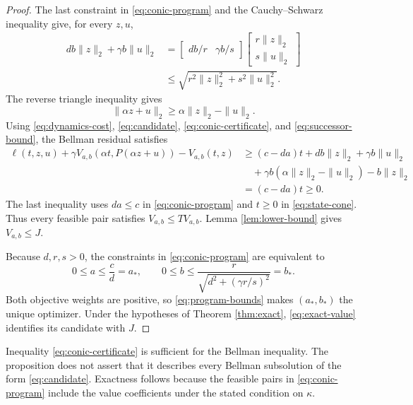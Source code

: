 \documentclass[10pt]{article}
\begin{document}
\begin{proof}
The last constraint in \eqref{eq:conic-program} and the Cauchy--Schwarz inequality give, for every $z,u$,
\begin{equation}
\begin{aligned}
db\|z\|_2+\gamma b\|u\|_2
&=\begin{bmatrix}db/r&\gamma b/s\end{bmatrix}
  \begin{bmatrix}r\|z\|_2\\s\|u\|_2\end{bmatrix}\\
&\leq\sqrt{r^2\|z\|_2^2+s^2\|u\|_2^2}.
\end{aligned}
\label{eq:conic-certificate}
\end{equation}
The reverse triangle inequality gives
\begin{equation}
\|\alpha z+u\|_2\geq\alpha\|z\|_2-\|u\|_2.
\label{eq:successor-bound}
\end{equation}
Using \eqref{eq:dynamics-cost}, \eqref{eq:candidate}, \eqref{eq:conic-certificate}, and \eqref{eq:successor-bound}, the Bellman residual satisfies
\begin{equation}
\begin{aligned}
\ell(t,z,u)+\gamma V_{a,b}(\alpha t,P(\alpha z+u))-V_{a,b}(t,z)
&\geq(c-da)t+db\|z\|_2+\gamma b\|u\|_2\\
&\quad+\gamma b(\alpha\|z\|_2-\|u\|_2)-b\|z\|_2\\
&=(c-da)t\geq0.
\end{aligned}
\label{eq:certified-residual}
\end{equation}
The last inequality uses $da\leq c$ in \eqref{eq:conic-program} and $t\geq0$ in \eqref{eq:state-cone}. Thus every feasible pair satisfies $V_{a,b}\leq TV_{a,b}$. Lemma \ref{lem:lower-bound} gives $V_{a,b}\leq J$.

Because $d,r,s>0$, the constraints in \eqref{eq:conic-program} are equivalent to
\begin{equation}
0\leq a\leq\frac{c}{d}=a_*,
\qquad
0\leq b\leq\frac{r}{\sqrt{d^2+(\gamma r/s)^2}}=b_*.
\label{eq:program-bounds}
\end{equation}
Both objective weights are positive, so \eqref{eq:program-bounds} makes $(a_*,b_*)$ the unique optimizer. Under the hypotheses of Theorem \ref{thm:exact}, \eqref{eq:exact-value} identifies its candidate with $J$.
\end{proof}

Inequality \eqref{eq:conic-certificate} is sufficient for the Bellman inequality. The proposition does not assert that it describes every Bellman subsolution of the form \eqref{eq:candidate}. Exactness follows because the feasible pairs in \eqref{eq:conic-program} include the value coefficients under the stated condition on $\kappa$.
\end{document}
